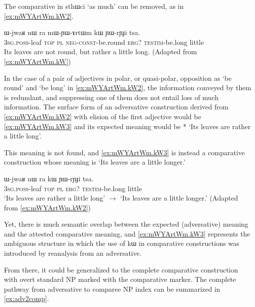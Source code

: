 \documentclass[oldfontcommands,oneside,a4paper,11pt]{article}
\newcommand{\ipa}[1]{{\phon #1}} %
\begin{document}
The comparative in \ipa{sthɯci} `as much' can be removed, as in \ref{ex:mWYArtWm.kW2}.  
 
            \begin{exe}
  \ex  \label{ex:mWYArtWm.kW2}  
  \gll      
\ipa{ɯ-jwaʁ} 	\ipa{nɯ} \ipa{ra} 	 	\ipa{mɯ-ɲɯ-ɤrtɯm} 	\ipa{kɯ} 	\ipa{ɲɯ-rɲɟi} 	\ipa{tsa.} \\
\textsc{3sg.poss}-leaf \textsc{top} \textsc{pl}  \textsc{neg-const}-be.round \textsc{erg?} \textsc{testim}-be.long little \\
\glt Its leaves are not round, but rather a little long.
(Adapted from \ref{ex:mWYArtWm.kW})
          \end{exe} 
          
          In the case of a pair of adjectives in polar, or quasi-polar, opposition as `be round' and  `be long' in \ref{ex:mWYArtWm.kW2}, the information conveyed by them is redundant, and suppressing one of them does not entail loss of much information.  The surface form of an adversative construction derived from \ref{ex:mWYArtWm.kW2}  with elision  of the first adjective would be    \ref{ex:mWYArtWm.kW3}  and its expected meaning would be * `Its leaves are  rather a little long'.
          
          This meaning is not found, and \ref{ex:mWYArtWm.kW3}   is instead a comparative construction whose meaning is `Its leaves are a little longer.' 
            
                      \begin{exe}
  \ex  \label{ex:mWYArtWm.kW3}  
  \gll      
\ipa{ɯ-jwaʁ} 	\ipa{nɯ}   \ipa{ra} 	\ipa{kɯ} 	\ipa{ɲɯ-rɲɟi} 	\ipa{tsa.} \\
\textsc{3sg.poss}-leaf \textsc{top} \textsc{pl}   \textsc{erg?} \textsc{testim}-be.long little \\
\glt *`Its leaves are rather a little long'  $\rightarrow$  `Its leaves are a little longer.'
(Adapted from \ref{ex:mWYArtWm.kW2})
          \end{exe} 
  
  
  Yet, there is much semantic overlap   between the expected (adversative) meaning and the attested comparative meaning, and \ref{ex:mWYArtWm.kW3}   represents the ambiguous structure in which the use of \ipa{kɯ} in comparative constructions was introduced by reanalysis from an adversative.
  
  From there, it could be generalized to the complete comparative construction with overt standard NP marked with the comparative marker. The complete pathway from adversative to comparee NP index can be summarized in \ref{ex:adv2comp}.
  
\end{document}
